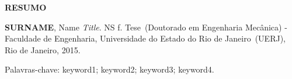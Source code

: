 \begin{center}
\textbf{RESUMO}
\end{center}


$\!$\\

\hspace{-1.3cm}\textbf{SURNAME}, Name \textit{Title}. NS f. Tese~(Doutorado em Engenharia Mecânica) - Faculdade de Engenharia, Universidade do Estado do Rio de Janeiro~(UERJ), Rio de Janeiro, 2015.

\vspace{.2cm}

\indent \lipsum[1]

\vspace{1cm}

\hspace{-1.3cm}Palavras-chave: keyword1; keyword2; keyword3; keyword4.